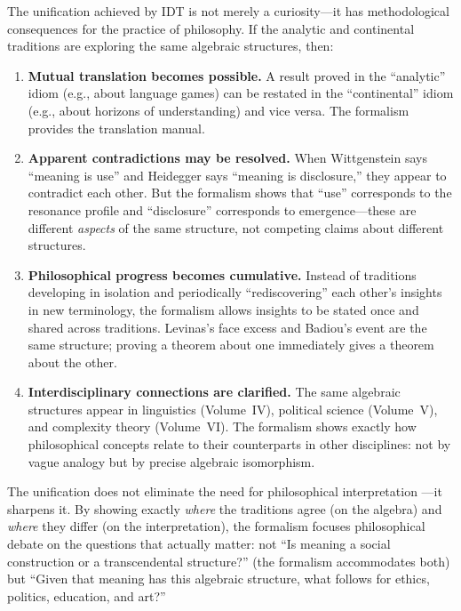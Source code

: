 \begin{remark}
The unification achieved by IDT is not merely a curiosity---it has
methodological consequences for the practice of philosophy. If the analytic
and continental traditions are exploring the same algebraic structures, then:

\begin{enumerate}
\item \textbf{Mutual translation becomes possible.} A result proved in the
``analytic'' idiom (e.g., about language games) can be restated in the
``continental'' idiom (e.g., about horizons of understanding) and vice versa.
The formalism provides the translation manual.

\item \textbf{Apparent contradictions may be resolved.} When Wittgenstein says
``meaning is use'' and Heidegger says ``meaning is disclosure,'' they appear
to contradict each other. But the formalism shows that ``use'' corresponds to
the resonance profile and ``disclosure'' corresponds to emergence---these are
different \emph{aspects} of the same structure, not competing claims about
different structures.

\item \textbf{Philosophical progress becomes cumulative.} Instead of
traditions developing in isolation and periodically ``rediscovering'' each
other's insights in new terminology, the formalism allows insights to be
stated once and shared across traditions. Levinas's face excess and Badiou's
event are the same structure; proving a theorem about one immediately gives
a theorem about the other.

\item \textbf{Interdisciplinary connections are clarified.} The same algebraic
structures appear in linguistics (Volume~IV), political science (Volume~V),
and complexity theory (Volume~VI). The formalism shows exactly how
philosophical concepts relate to their counterparts in other disciplines:
not by vague analogy but by precise algebraic isomorphism.
\end{enumerate}

The unification does not eliminate the need for philosophical interpretation
---it sharpens it. By showing exactly \emph{where} the traditions agree
(on the algebra) and \emph{where} they differ (on the interpretation), the
formalism focuses philosophical debate on the questions that actually matter:
not ``Is meaning a social construction or a transcendental structure?''
(the formalism accommodates both) but ``Given that meaning has this
algebraic structure, what follows for ethics, politics, education, and art?''
\end{remark}


